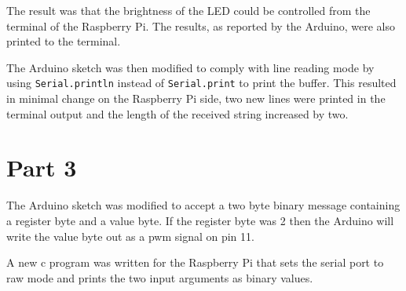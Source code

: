\documentclass{article}
\begin{document}
The result was that the brightness of the LED could be controlled from the terminal of the Raspberry Pi. The results, as reported by the Arduino, were also printed to the terminal.

The Arduino sketch was then modified to comply with line reading mode by using \verb!Serial.println! instead of \verb!Serial.print! to print the buffer. This resulted in minimal change on the Raspberry Pi side, two new lines were printed in the terminal output and the length of the received string increased by two.

\section*{Part 3}
The Arduino sketch was modified to accept a two byte binary message containing a register byte and a value byte. If the register byte was 2 then the Arduino will write the value byte out as a pwm signal on pin 11.

A new c program was written for the Raspberry Pi that sets the serial port to raw mode and prints the two input arguments as binary values.





\end{document}
